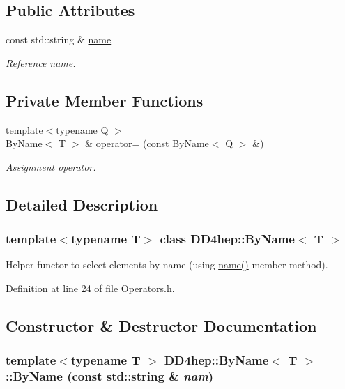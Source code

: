 \subsection*{Public Attributes}
\begin{DoxyCompactItemize}
\item 
const std::string \& \hyperlink{class_d_d4hep_1_1_by_name_a06f4c668c9195f670ee1ace07191efa1}{name}
\begin{DoxyCompactList}\small\item\em Reference name. \item\end{DoxyCompactList}\end{DoxyCompactItemize}
\subsection*{Private Member Functions}
\begin{DoxyCompactItemize}
\item 
{\footnotesize template$<$typename Q $>$ }\\\hyperlink{class_d_d4hep_1_1_by_name}{ByName}$<$ \hyperlink{class_t}{T} $>$ \& \hyperlink{class_d_d4hep_1_1_by_name_a558d846021ba7038c1446b2f11677c06}{operator=} (const \hyperlink{class_d_d4hep_1_1_by_name}{ByName}$<$ Q $>$ \&)
\begin{DoxyCompactList}\small\item\em Assignment operator. \item\end{DoxyCompactList}\end{DoxyCompactItemize}


\subsection{Detailed Description}
\subsubsection*{template$<$typename T$>$ class DD4hep::ByName$<$ T $>$}

Helper functor to select elements by name (using \hyperlink{class_d_d4hep_1_1_by_name_a06f4c668c9195f670ee1ace07191efa1}{name()} member method). 

Definition at line 24 of file Operators.h.

\subsection{Constructor \& Destructor Documentation}
\hypertarget{class_d_d4hep_1_1_by_name_af56a0a47ed14c746731c5b3d7e4eeadd}{
\subsubsection[{ByName}]{\setlength{\rightskip}{0pt plus 5cm}template$<$typename T $>$ {\bf DD4hep::ByName}$<$ {\bf T} $>$::{\bf ByName} (const std::string \& {\em nam})}}
\label{class_d_d4hep_1_1_by_name_af56a0a47ed14c746731c5b3d7e4eeadd}


